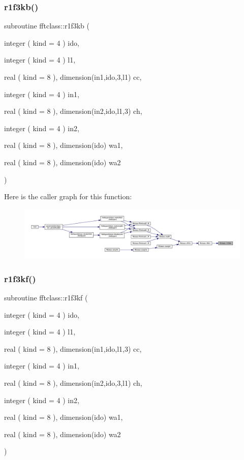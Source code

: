 \subsubsection{\texorpdfstring{r1f3kb()}{r1f3kb()}}
{\footnotesize\ttfamily subroutine fftclass\+::r1f3kb (\begin{DoxyParamCaption}\item[{integer ( kind = 4 )}]{ido,  }\item[{integer ( kind = 4 )}]{l1,  }\item[{real ( kind = 8 ), dimension(in1,ido,3,l1)}]{cc,  }\item[{integer ( kind = 4 )}]{in1,  }\item[{real ( kind = 8 ), dimension(in2,ido,l1,3)}]{ch,  }\item[{integer ( kind = 4 )}]{in2,  }\item[{real ( kind = 8 ), dimension(ido)}]{wa1,  }\item[{real ( kind = 8 ), dimension(ido)}]{wa2 }\end{DoxyParamCaption})}

Here is the caller graph for this function\+:\nopagebreak
\begin{figure}[H]
\begin{center}
\leavevmode
\includegraphics[width=350pt]{namespacefftclass_ad450dc5bf08d49d4784e609c41b42950_icgraph}
\end{center}
\end{figure}
\mbox{\label{namespacefftclass_a382f39146e7d8e1450810efdc6f4cd79}} 
\subsubsection{\texorpdfstring{r1f3kf()}{r1f3kf()}}
{\footnotesize\ttfamily subroutine fftclass\+::r1f3kf (\begin{DoxyParamCaption}\item[{integer ( kind = 4 )}]{ido,  }\item[{integer ( kind = 4 )}]{l1,  }\item[{real ( kind = 8 ), dimension(in1,ido,l1,3)}]{cc,  }\item[{integer ( kind = 4 )}]{in1,  }\item[{real ( kind = 8 ), dimension(in2,ido,3,l1)}]{ch,  }\item[{integer ( kind = 4 )}]{in2,  }\item[{real ( kind = 8 ), dimension(ido)}]{wa1,  }\item[{real ( kind = 8 ), dimension(ido)}]{wa2 }\end{DoxyParamCaption})}

